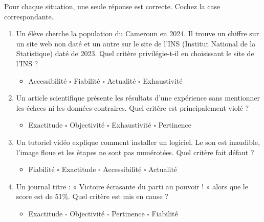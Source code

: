 \documentclass[11pt]{article}
\begin{document}
\begin{exercice}
Pour chaque situation, une seule réponse est correcte. Cochez la case correspondante.
\begin{enumerate}
    \item Un élève cherche la population du Cameroun en 2024. Il trouve un chiffre sur un site web non daté et un autre sur le site de l'INS (Institut National de la Statistique) daté de 2023. Quel critère privilégie-t-il en choisissant le site de l'INS ?
    \begin{itemize}
        \item[$\square$] Accessibilité \quad $\square$ Fiabilité \quad $\square$ Actualité \quad $\square$ Exhaustivité
    \end{itemize}
    \item Un article scientifique présente les résultats d'une expérience sans mentionner les échecs ni les données contraires. Quel critère est principalement violé ?
    \begin{itemize}
        \item[$\square$] Exactitude \quad $\square$ Objectivité \quad $\square$ Exhaustivité \quad $\square$ Pertinence
    \end{itemize}
    \item Un tutoriel vidéo explique comment installer un logiciel. Le son est inaudible, l'image floue et les étapes ne sont pas numérotées. Quel critère fait défaut ?
    \begin{itemize}
        \item[$\square$] Fiabilité \quad $\square$ Exactitude \quad $\square$ Accessibilité \quad $\square$ Actualité
    \end{itemize}
    \item Un journal titre : « Victoire écrasante du parti au pouvoir ! » alors que le score est de 51\%. Quel critère est mis en cause ?
    \begin{itemize}
        \item[$\square$] Exactitude \quad $\square$ Objectivité \quad $\square$ Pertinence \quad $\square$ Fiabilité
    \end{itemize}
\end{enumerate}
\end{exercice}
\end{document}
